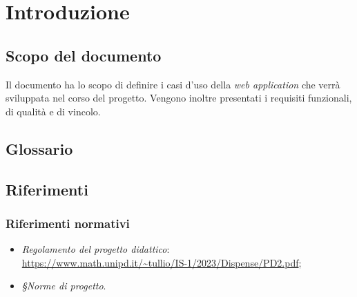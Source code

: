 \documentclass[10pt, a4paper]{article}
\title{\titolo}
\author{SWEetCode}
\begin{document}



\newpage

\tableofcontents
\newpage

\section{Introduzione}
\subsection{Scopo del documento}
Il documento ha lo scopo di definire i casi d'uso della \textit{web application} che verrà sviluppata nel corso del progetto. Vengono inoltre presentati i requisiti funzionali, di qualità e di vincolo. %
\\
\subsection{Glossario}

\subsection{Riferimenti}
   \subsubsection{Riferimenti normativi}
   \begin{itemize}
    \item \textit{Regolamento del progetto didattico}: \\
    \href{https://www.math.unipd.it/~tullio/IS-1/2023/Dispense/PD2.pdf}{https://www.math.unipd.it/\textasciitilde tullio/IS-1/2023/Dispense/PD2.pdf};
    \item \textit{\S Norme di progetto}.
    \end{itemize}
    
\end{document}
